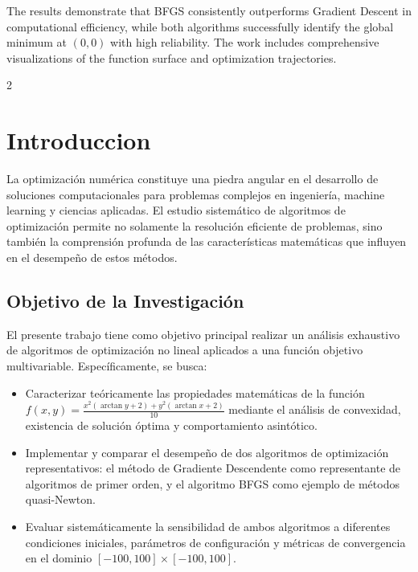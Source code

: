 \documentclass[11pt, a4paper, twocolumn]{beamer}
\begin{document}
	\begin{frame}
		The results demonstrate that BFGS consistently outperforms Gradient Descent in computational efficiency, while both algorithms successfully identify the global minimum at $(0,0)$ with high reliability. The work includes comprehensive visualizations of the function surface and optimization trajectories.
	\end{frame}
	
	\begin{multicols}{2}
		\section{Introduccion}
			La optimización numérica constituye una piedra angular en el desarrollo de soluciones computacionales para problemas complejos en ingeniería, machine learning y ciencias aplicadas. El estudio sistemático de algoritmos de optimización permite no solamente la resolución eficiente de problemas, sino también la comprensión profunda de las características matemáticas que influyen en el desempeño de estos métodos.
		
		\subsection{Objetivo de la Investigación}
			
			El presente trabajo tiene como objetivo principal realizar un análisis exhaustivo de algoritmos de optimización no lineal aplicados a una función objetivo multivariable. Específicamente, se busca:
		\begin{itemize}
			\item Caracterizar teóricamente las propiedades matemáticas de la función $f(x,y) = \frac{x^2 (\arctan y + 2) + y^2 (\arctan x + 2)}{10}$ mediante el análisis de convexidad, existencia de solución óptima y comportamiento asintótico.
			
			\item Implementar y comparar el desempeño de dos algoritmos de optimización representativos: el método de Gradiente Descendente como representante de algoritmos de primer orden, y el algoritmo BFGS como ejemplo de métodos quasi-Newton.
			
			\item Evaluar sistemáticamente la sensibilidad de ambos algoritmos a diferentes condiciones iniciales, parámetros de configuración y métricas de convergencia en el dominio $[-100, 100] \times [-100, 100]$.
			

\end{itemize}
\end{multicols}
\end{document}
